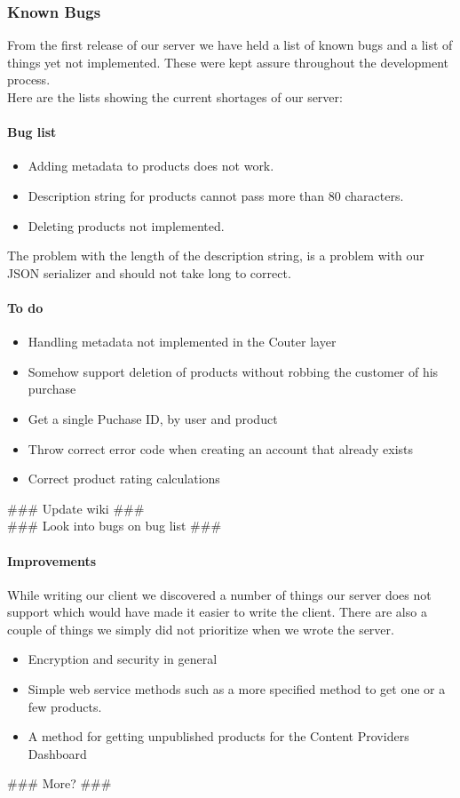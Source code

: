 \subsubsection{Known Bugs}
From the first release of our server we have held a list of known bugs and a list of things yet not implemented. These were kept assure throughout the development process.
\\Here are the lists showing the current shortages of our server:
\paragraph{Bug list}
\begin{itemize}
\item Adding metadata to products does not work.
\item Description string for products cannot pass more than 80 characters.
\item Deleting products not implemented.
\end{itemize}
The problem with the length of the description string, is a problem with our JSON serializer and should not take long to correct.
\paragraph{To do}
\begin{itemize}
\item Handling metadata not implemented in the C\Sh outer layer
\item Somehow support deletion of products without robbing the customer of his purchase
\item Get a single Puchase ID, by user and product
\item Throw correct error code when creating an account that already exists
\item Correct product rating calculations
\end{itemize}
\#\#\# Update wiki \#\#\#\\
\#\#\# Look into bugs on bug list \#\#\#
\paragraph{Improvements}
While writing our client we discovered a number of things our server does not support which would have made it easier to write the client. There are also a couple of things we simply did not prioritize when we wrote the server.
\begin{itemize}
\item Encryption and security in general
\item Simple web service methods such as a more specified method to get one or a few products.
\item A method for getting unpublished products for the Content Providers Dashboard
\end{itemize}
\#\#\# More? \#\#\#